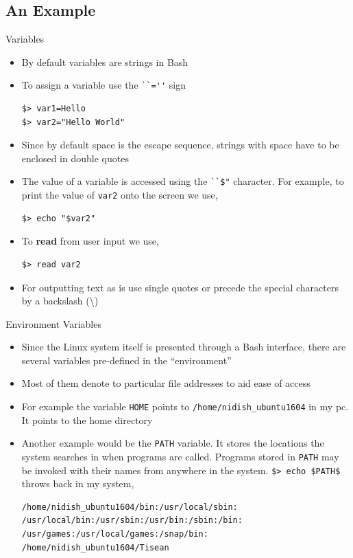 \documentclass{beamer}
\begin{document}
\subsection{An Example}
\begin{frame}[fragile]{Variables}
  \begin{itemize}
    \item By default variables are strings in Bash
    \item To assign a variable use the \verb|``=''| sign
\begin{verbatim}
$> var1=Hello
$> var2="Hello World"
\end{verbatim}
    \item Since by default space is the escape sequence, strings with
      space have to be enclosed in double quotes
    \item The value of a variable is accessed using the \verb+``$"+
      character. For example, to print the value of \verb+var2+ onto
      the screen we use,
\begin{verbatim}
$> echo "$var2"
\end{verbatim}
    \item To \textbf{read} from user input we use,
\begin{verbatim}
$> read var2
\end{verbatim}
    \item For outputting text as is use single quotes or precede the
      special characters by a backslash (\textbackslash{})
\end{itemize}
\end{frame}

\begin{frame}[fragile]{Environment Variables}
  \begin{itemize}
  \item Since the Linux system itself is presented through a Bash
    interface, there are several variables pre-defined in the
    ``environment''
  \item Most of them denote to particular file addresses to aid ease
    of access
  \item For example the variable \verb+HOME+ points to
    \verb+/home/nidish_ubuntu1604+ in my pc. It points to the home
    directory
  \item Another example would be the \verb|PATH| variable. It stores
    the locations the system searches in when programs are
    called. Programs stored in \verb|PATH| may be invoked with their
    names from anywhere in the system. \verb+$> echo $PATH$+ throws
    back in my system,
\begin{verbatim}
/home/nidish_ubuntu1604/bin:/usr/local/sbin:
/usr/local/bin:/usr/sbin:/usr/bin:/sbin:/bin:
/usr/games:/usr/local/games:/snap/bin:
/home/nidish_ubuntu1604/Tisean
\end{verbatim}
  \end{itemize}
\end{frame}
\end{document}
